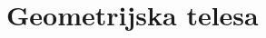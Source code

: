 \documentclass{article}
\begin{document}
\pagestyle{empty}

\begin{comment}
definitions
\end{comment}

\section{ Geometrijska telesa }
\subsection{  }
\end{document}
